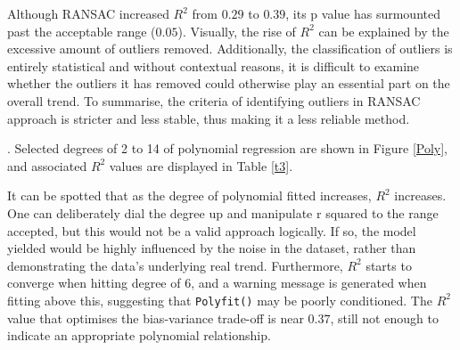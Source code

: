 \documentclass[12pt]{article}
\begin{document}
Although RANSAC increased $R^2$ from $0.29$ to $0.39$, its p value has surmounted past the acceptable range ($0.05$). Visually, the rise of $R^2$ can be explained by the excessive amount of outliers removed. Additionally, the classification of outliers is entirely statistical and without contextual reasons, it is difficult to examine whether the outliers it has removed could otherwise play an essential part on the overall trend. To summarise, the criteria of identifying outliers in RANSAC approach is stricter and less stable, thus making it a less reliable method. 


. 
Selected degrees of 2 to 14 of polynomial regression are shown in Figure  \eqref{Poly}, and associated $R^2$ values are displayed in Table \eqref{t3}. 


\begin{table}[H]
\begin{center}
\captionsetup{font=scriptsize}
\caption{coefficients related to the relationship between original and log-transformed total budget spent and obesity density} \label{t3}
\end{center}
\end{table}

It can be spotted that as the degree of polynomial fitted increases, $R^2$ increases. One can deliberately dial the degree up and manipulate r squared to the range accepted, but this would not be a valid approach logically. If so, the model yielded would be highly influenced by the noise in the dataset, rather than demonstrating the data’s underlying real trend. Furthermore, $R^2$ starts to converge when hitting degree of 6, and a warning message is generated when fitting above this, suggesting that \verb|Polyfit()| may be poorly conditioned. The $R^2$ value that optimises the bias-variance trade-off is near $0.37$, still not enough to indicate an appropriate polynomial relationship. 
\end{document}

